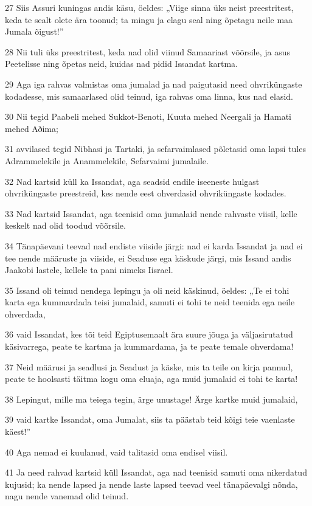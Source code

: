\par 27 Siis Assuri kuningas andis käsu, öeldes: „Viige sinna üks neist preestritest, keda te sealt olete ära toonud; ta mingu ja elagu seal ning õpetagu neile maa Jumala õigust!”
\par 28 Nii tuli üks preestritest, keda nad olid viinud Samaariast võõrsile, ja asus Peetelisse ning õpetas neid, kuidas nad pidid Issandat kartma.
\par 29 Aga iga rahvas valmistas oma jumalad ja nad paigutasid need ohvriküngaste kodadesse, mis samaarlased olid teinud, iga rahvas oma linna, kus nad elasid.
\par 30 Nii tegid Paabeli mehed Sukkot-Benoti, Kuuta mehed Neergali ja Hamati mehed Aðima;
\par 31 avvilased tegid Nibhasi ja Tartaki, ja sefarvaimlased põletasid oma lapsi tules Adrammelekile ja Anammelekile, Sefarvaimi jumalaile.
\par 32 Nad kartsid küll ka Issandat, aga seadsid endile iseeneste hulgast ohvriküngaste preestreid, kes nende eest ohverdasid ohvriküngaste kodades.
\par 33 Nad kartsid Issandat, aga teenisid oma jumalaid nende rahvaste viisil, kelle keskelt nad olid toodud võõrsile.
\par 34 Tänapäevani teevad nad endiste viiside järgi: nad ei karda Issandat ja nad ei tee nende määruste ja viiside, ei Seaduse ega käskude järgi, mis Issand andis Jaakobi lastele, kellele ta pani nimeks Iisrael.
\par 35 Issand oli teinud nendega lepingu ja oli neid käskinud, öeldes: „Te ei tohi karta ega kummardada teisi jumalaid, samuti ei tohi te neid teenida ega neile ohverdada,
\par 36 vaid Issandat, kes tõi teid Egiptusemaalt ära suure jõuga ja väljasirutatud käsivarrega, peate te kartma ja kummardama, ja te peate temale ohverdama!
\par 37 Neid määrusi ja seadlusi ja Seadust ja käske, mis ta teile on kirja pannud, peate te hoolsasti täitma kogu oma eluaja, aga muid jumalaid ei tohi te karta!
\par 38 Lepingut, mille ma teiega tegin, ärge unustage! Ärge kartke muid jumalaid,
\par 39 vaid kartke Issandat, oma Jumalat, siis ta päästab teid kõigi teie vaenlaste käest!”
\par 40 Aga nemad ei kuulanud, vaid talitasid oma endisel viisil.
\par 41 Ja need rahvad kartsid küll Issandat, aga nad teenisid samuti oma nikerdatud kujusid; ka nende lapsed ja nende laste lapsed teevad veel tänapäevalgi nõnda, nagu nende vanemad olid teinud.

